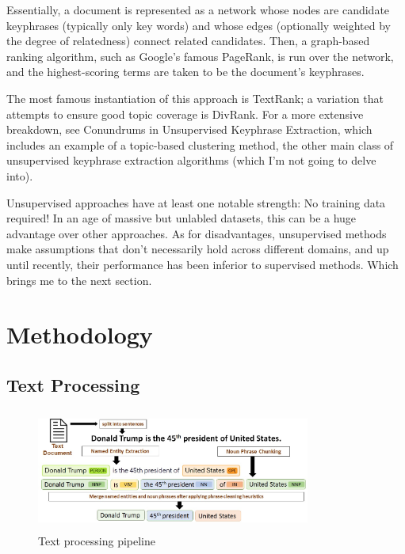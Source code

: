 \documentclass[conference]{IEEEtran}
\begin{document}
Essentially, a document is represented as a network whose nodes are candidate keyphrases (typically only key words) and whose edges (optionally weighted by the degree of relatedness) connect related candidates. Then, a graph-based ranking algorithm, such as Google’s famous PageRank, is run over the network, and the highest-scoring terms are taken to be the document’s keyphrases.

The most famous instantiation of this approach is TextRank; a variation that attempts to ensure good topic coverage is DivRank. For a more extensive breakdown, see Conundrums in Unsupervised Keyphrase Extraction, which includes an example of a topic-based clustering method, the other main class of unsupervised keyphrase extraction algorithms (which I’m not going to delve into).

Unsupervised approaches have at least one notable strength: No training data required! In an age of massive but unlabled datasets, this can be a huge advantage over other approaches. As for disadvantages, unsupervised methods make assumptions that don’t necessarily hold across different domains, and up until recently, their performance has been inferior to supervised methods. Which brings me to the next section.



\section{Methodology \label{methodology}}

\subsection{Text Processing \label{text-processing}}

\begin{figure}
\centering
  \includegraphics[width=9cm, height=4cm]{text-processing.jpg}
\captionsetup{justification=centering}
  \caption{\small Text processing pipeline}
  \label{fig:framework}
\end{figure}
\end{document}
